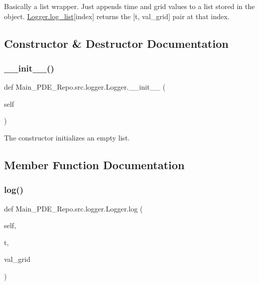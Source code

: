 Basically a list wrapper. Just appends time and grid values to a list stored in the object. \hyperlink{classMain__PDE__Repo_1_1src_1_1logger_1_1Logger_a159655c83565fd1bfbbabb470ea7da0f}{Logger.\+log\+\_\+list}\mbox{[}index\mbox{]} returns the \mbox{[}t, val\+\_\+grid\mbox{]} pair at that index. 

\subsection{Constructor \& Destructor Documentation}
\mbox{\label{classMain__PDE__Repo_1_1src_1_1logger_1_1Logger_a1cb1b576ea43629aba66f291b97099e2}} 
\subsubsection{\texorpdfstring{\+\_\+\+\_\+init\+\_\+\+\_\+()}{\_\_init\_\_()}}
{\footnotesize\ttfamily def Main\+\_\+\+P\+D\+E\+\_\+\+Repo.\+src.\+logger.\+Logger.\+\_\+\+\_\+init\+\_\+\+\_\+ (\begin{DoxyParamCaption}\item[{}]{self }\end{DoxyParamCaption})}



The constructor initializes an empty list. 



\subsection{Member Function Documentation}
\mbox{\label{classMain__PDE__Repo_1_1src_1_1logger_1_1Logger_a5028b1f1929f7124fc5322aaa917f118}} 
\subsubsection{\texorpdfstring{log()}{log()}}
{\footnotesize\ttfamily def Main\+\_\+\+P\+D\+E\+\_\+\+Repo.\+src.\+logger.\+Logger.\+log (\begin{DoxyParamCaption}\item[{}]{self,  }\item[{}]{t,  }\item[{}]{val\+\_\+grid }\end{DoxyParamCaption})}




